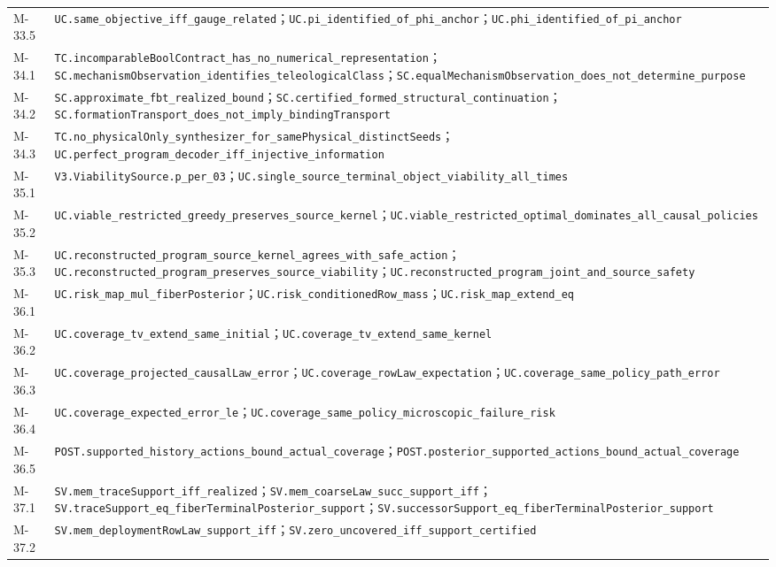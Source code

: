 \documentclass[
  11pt,
  oneside]{book}
\begin{document}
{\begin{longtable}[]{@{}
  >{\raggedright\arraybackslash}p{}
  >{\raggedright\arraybackslash}p{}@{}}
M-33.5 & \nolinkurl{UC.same_objective_iff_gauge_related}；\nolinkurl{UC.pi_identified_of_phi_anchor}；\nolinkurl{UC.phi_identified_of_pi_anchor} \\
M-34.1 & \nolinkurl{TC.incomparableBoolContract_has_no_numerical_representation}；\nolinkurl{SC.mechanismObservation_identifies_teleologicalClass}；\nolinkurl{SC.equalMechanismObservation_does_not_determine_purpose} \\
M-34.2 & \nolinkurl{SC.approximate_fbt_realized_bound}；\nolinkurl{SC.certified_formed_structural_continuation}；\nolinkurl{SC.formationTransport_does_not_imply_bindingTransport} \\
M-34.3 & \nolinkurl{TC.no_physicalOnly_synthesizer_for_samePhysical_distinctSeeds}；\nolinkurl{UC.perfect_program_decoder_iff_injective_information} \\
M-35.1 & \nolinkurl{V3.ViabilitySource.p_per_03}；\nolinkurl{UC.single_source_terminal_object_viability_all_times} \\
M-35.2 & \nolinkurl{UC.viable_restricted_greedy_preserves_source_kernel}；\nolinkurl{UC.viable_restricted_optimal_dominates_all_causal_policies} \\
M-35.3 & \nolinkurl{UC.reconstructed_program_source_kernel_agrees_with_safe_action}；\nolinkurl{UC.reconstructed_program_preserves_source_viability}；\nolinkurl{UC.reconstructed_program_joint_and_source_safety} \\
M-36.1 & \nolinkurl{UC.risk_map_mul_fiberPosterior}；\nolinkurl{UC.risk_conditionedRow_mass}；\nolinkurl{UC.risk_map_extend_eq} \\
M-36.2 & \nolinkurl{UC.coverage_tv_extend_same_initial}；\nolinkurl{UC.coverage_tv_extend_same_kernel} \\
M-36.3 & \nolinkurl{UC.coverage_projected_causalLaw_error}；\nolinkurl{UC.coverage_rowLaw_expectation}；\nolinkurl{UC.coverage_same_policy_path_error} \\
M-36.4 & \nolinkurl{UC.coverage_expected_error_le}；\nolinkurl{UC.coverage_same_policy_microscopic_failure_risk} \\
M-36.5 & \nolinkurl{POST.supported_history_actions_bound_actual_coverage}；\nolinkurl{POST.posterior_supported_actions_bound_actual_coverage} \\
M-37.1 & \nolinkurl{SV.mem_traceSupport_iff_realized}；\nolinkurl{SV.mem_coarseLaw_succ_support_iff}；\nolinkurl{SV.traceSupport_eq_fiberTerminalPosterior_support}；\nolinkurl{SV.successorSupport_eq_fiberTerminalPosterior_support} \\
M-37.2 & \nolinkurl{SV.mem_deploymentRowLaw_support_iff}；\nolinkurl{SV.zero_uncovered_iff_support_certified} \\

\end{longtable}}
\end{document}
